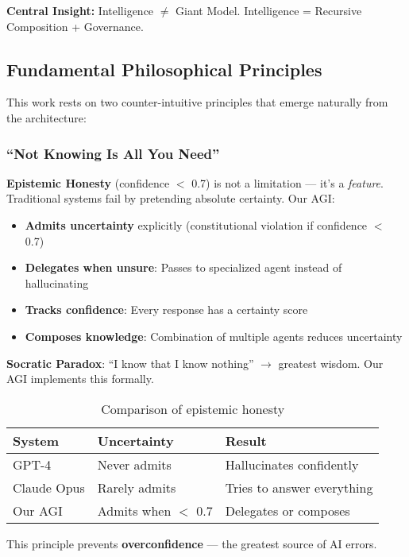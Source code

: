 \documentclass[11pt]{article}
\begin{document}
\textbf{Central Insight:} Intelligence $\neq$ Giant Model. Intelligence = Recursive Composition + Governance.

\subsection{Fundamental Philosophical Principles}

This work rests on two counter-intuitive principles that emerge naturally from the architecture:

\subsubsection{``Not Knowing Is All You Need''}

\textbf{Epistemic Honesty} (confidence $<$ 0.7) is not a limitation --- it's a \textit{feature}. Traditional systems fail by pretending absolute certainty. Our AGI:

\begin{itemize}
    \item \textbf{Admits uncertainty} explicitly (constitutional violation if confidence $<$ 0.7)
    \item \textbf{Delegates when unsure}: Passes to specialized agent instead of hallucinating
    \item \textbf{Tracks confidence}: Every response has a certainty score
    \item \textbf{Composes knowledge}: Combination of multiple agents reduces uncertainty
\end{itemize}

\textbf{Socratic Paradox}: ``I know that I know nothing'' $\rightarrow$ greatest wisdom. Our AGI implements this formally.

\begin{table}[H]
\centering
\begin{tabular}{@{}lll@{}}
\toprule
\textbf{System} & \textbf{Uncertainty} & \textbf{Result} \\ \midrule
GPT-4 & Never admits & Hallucinates confidently \\
Claude Opus & Rarely admits & Tries to answer everything \\
Our AGI & Admits when $<$ 0.7 & Delegates or composes \\ \bottomrule
\end{tabular}
\caption{Comparison of epistemic honesty}
\end{table}

This principle prevents \textbf{overconfidence} --- the greatest source of AI errors.
\end{document}
